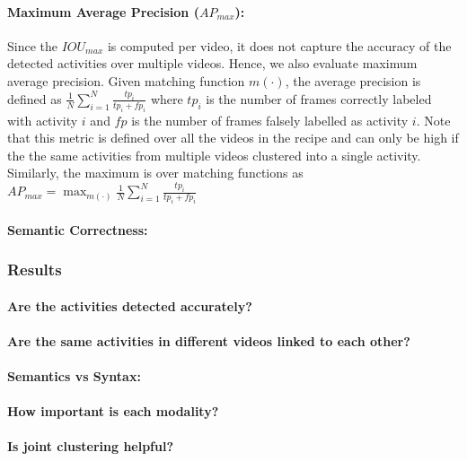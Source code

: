 \paragraph{Maximum Average Precision ($AP_{max}$):}
Since the $IOU_{max}$ is computed per video, it does not capture the accuracy of the detected activities over multiple videos. Hence, we also evaluate maximum average precision. Given matching function $m(\cdot)$, the average precision is defined as $\frac{1}{N}\sum_{i =1}^N\frac{tp_i}{tp_i+fp_i}$ where $tp_i$ is the number of frames correctly labeled with activity $i$ and $fp$ is the number of frames falsely labelled as activity $i$. Note that this metric is defined over all the videos in the recipe and can only be high if the the same activities from multiple videos clustered into a single activity. Similarly, the maximum is over matching functions as \mbox{$AP_{max}=\max_{m(\cdot)} \frac{1}{N}\sum_{i =1}^N\frac{tp_i}{tp_i+fp_i}$}
\paragraph{Semantic Correctness:}

\subsubsection{Results}
\paragraph{Are the activities detected accurately?}
\paragraph{Are the same activities in different videos linked to each other?}
\paragraph{Semantics vs Syntax:}
\paragraph{How important is each modality?}
\paragraph{Is joint clustering helpful?}
